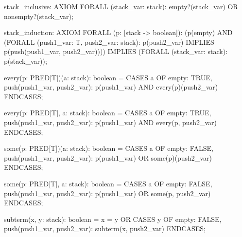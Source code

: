   stack_inclusive: AXIOM
    FORALL (stack_var: stack): empty?(stack_var) OR nonempty?(stack_var);

  stack_induction: AXIOM
    FORALL (p: [stack -> boolean]):
      (p(empty) AND
        (FORALL (push1_var: T, push2_var: stack):
           p(push2_var) IMPLIES p(push(push1_var, push2_var))))
       IMPLIES (FORALL (stack_var: stack): p(stack_var));

  every(p: PRED[T])(a: stack):  boolean =
      CASES a
        OF empty: TRUE,
           push(push1_var, push2_var): p(push1_var) AND every(p)(push2_var)
        ENDCASES;

  every(p: PRED[T], a: stack):  boolean =
      CASES a
        OF empty: TRUE,
           push(push1_var, push2_var): p(push1_var) AND every(p, push2_var)
        ENDCASES;

  some(p: PRED[T])(a: stack):  boolean =
      CASES a
        OF empty: FALSE,
           push(push1_var, push2_var): p(push1_var) OR some(p)(push2_var)
        ENDCASES;

  some(p: PRED[T], a: stack):  boolean =
      CASES a
        OF empty: FALSE,
           push(push1_var, push2_var): p(push1_var) OR some(p, push2_var)
        ENDCASES;

  subterm(x, y: stack):  boolean =
      x = y OR
       CASES y
         OF empty: FALSE, push(push1_var, push2_var): subterm(x, push2_var)
         ENDCASES;
